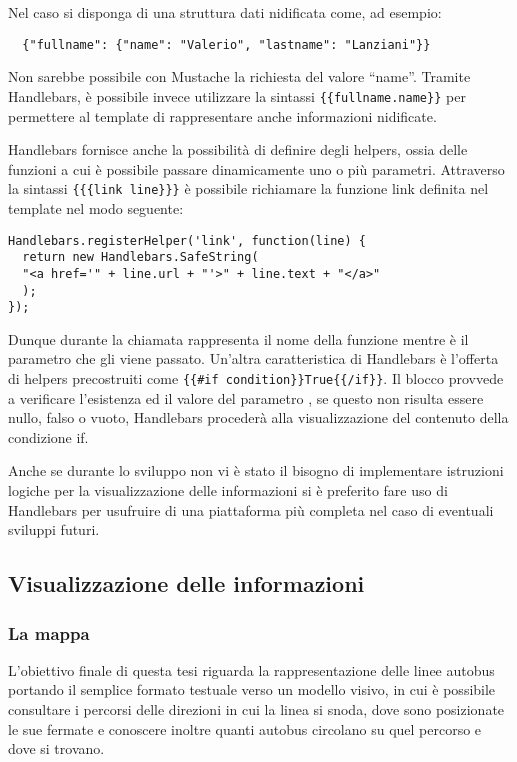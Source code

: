 Nel caso si disponga di una struttura dati nidificata come, ad esempio:
{\small
\begin{verbatim}
  {"fullname": {"name": "Valerio", "lastname": "Lanziani"}}
\end{verbatim}
}
Non sarebbe possibile con Mustache la richiesta del valore ``name''. Tramite Handlebars, è possibile invece utilizzare la sintassi \lstinline!{{fullname.name}}! per permettere al template di rappresentare anche informazioni nidificate.

Handlebars fornisce anche la possibilità di definire degli helpers, ossia delle funzioni a cui è possibile passare dinamicamente uno o più parametri. Attraverso la sintassi \lstinline!{{{link line}}}! è possibile richiamare la funzione link definita nel template nel modo seguente:
{\small
\begin{verbatim}
Handlebars.registerHelper('link', function(line) {
  return new Handlebars.SafeString(
  "<a href='" + line.url + "'>" + line.text + "</a>"
  );
});
\end{verbatim}
}
Dunque durante la chiamata  rappresenta il nome della funzione mentre  è il parametro che gli viene passato.
Un'altra caratteristica di Handlebars è l'offerta di helpers precostruiti come \lstinline!{{#if condition}}True{{/if}}!. Il blocco provvede a verificare l'esistenza ed il valore del parametro , se questo non risulta essere nullo, falso o vuoto, Handlebars procederà alla visualizzazione del contenuto della condizione if.

Anche se durante lo sviluppo non vi è stato il bisogno di implementare istruzioni logiche per la visualizzazione delle informazioni si è preferito fare uso di Handlebars per usufruire di una piattaforma più completa nel caso di eventuali sviluppi futuri.

\newpage

\subsection{Visualizzazione delle informazioni} %
\label{sub:visualizzazione_delle_informazioni}

\subsubsection{La mappa} %
\label{ssub:la_mappa}

L'obiettivo finale di questa tesi riguarda la rappresentazione delle linee autobus portando il semplice formato testuale verso un modello visivo, in cui è possibile consultare i percorsi delle direzioni in cui la linea si snoda, dove sono posizionate le sue fermate e conoscere inoltre quanti autobus circolano su quel percorso e dove si trovano.


